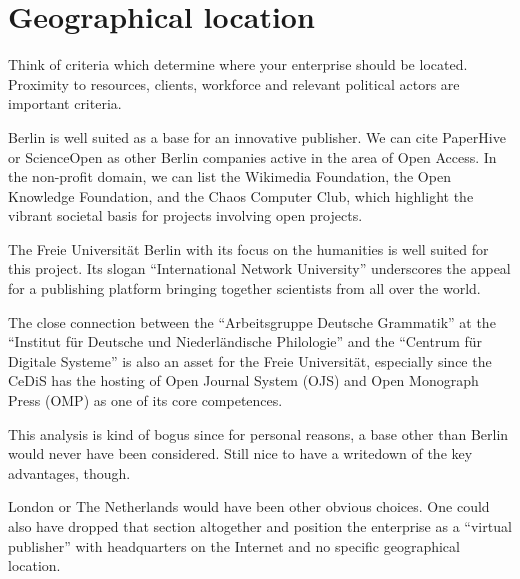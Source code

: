 \documentclass[nonflat,smallfont
]{langsci/langscibook}
\newcommand{\background}[1]{ 
  \vspace{5mm}
  \renewcommand{\tblslinecolour}{lsDarkBlue}
  \tblssy[red]{explore2}{Background}{\vspace*{-5mm}#1}
}
\newcommand{\langscisolution}[1]{
  \renewcommand{\tblslinecolour}{lsLightBlue}
  \tblssy{langsci}{LangSci solution}{\vspace*{-5mm}#1}
}
\newcommand{\evaluation}[1]{
  \renewcommand{\tblslinecolour}{lsLightOrange}
  \tblssy{receipt}{Evaluation}{\vspace*{-5mm}#1}
}
\newcommand{\othersolutions}[1]{
  \renewcommand{\tblslinecolour}{lsDarkGreenOne}
  \tblssy{more}{Other solutions}{\vspace*{-5mm}#1}
}
\renewcommand{\tblssy}[4][black!12]{%
  \renewcommand{\langscisymbol}{#2}\renewcommand{\tblsboxcolor}{#1}
  \begin{mdframed}[style=yellowexercise,frametitle={#3}]
    #4
  \end{mdframed}
}
\begin{document}
\section{Geographical location}
\vspace*{5mm}
\background{Think of criteria which determine where your enterprise should be located. Proximity to resources, clients, workforce and relevant political actors are important criteria.}
\langscisolution{
Berlin is well suited as a base for an innovative publisher. We can cite PaperHive or ScienceOpen as other Berlin companies active in the area of Open Access. In the non-profit domain, we can list the Wikimedia Foundation, the Open Knowledge Foundation, and the Chaos Computer Club, which highlight the vibrant societal basis for projects involving open projects. 

The Freie Universität Berlin with its focus on the humanities is well suited for this project. Its slogan ``International Network University'' underscores the appeal for a publishing platform bringing together scientists from all over the world. 

The close connection between the ``Arbeitsgruppe Deutsche Grammatik'' at the ``Institut für Deutsche und Niederländische Philologie'' and the ``Centrum für Digitale Systeme'' is also an asset for the Freie Universität, especially since the CeDiS has the hosting of Open Journal System (OJS) and Open Monograph Press (OMP) as one of its core competences.
}
\evaluation{This analysis is kind of bogus since for personal reasons, a base other than Berlin would never have been considered. Still nice to have a writedown of the key advantages, though.}
\othersolutions{London or The Netherlands would have been other obvious choices. One could also have dropped that section altogether and position the enterprise as a ``virtual publisher'' with headquarters on the Internet and no specific geographical location.}
 
\end{document}
